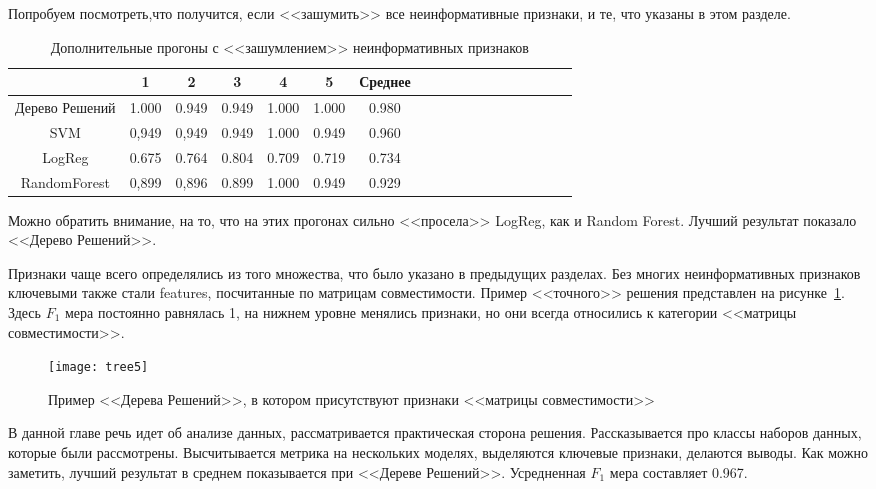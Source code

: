 Попробуем посмотреть,что получится, если <<зашумить>> все неинформативные признаки, и те, что указаны в этом разделе.

\begin{table}[!h]
	\centering
	\caption{Дополнительные прогоны с <<зашумлением>> неинформативных признаков }
	\label{tab4}
			\begin{tabu}{|*{18}{c|}}\hline
			&  1  & 2 & 3 & 4 & 5 & Среднее \\\hline
			Дерево Решений & 1.000 & 0.949 & 0.949  & 1.000 & 1.000 & 0.980 \\\hline
			SVM                    &  0,949  & 0,949  & 0.949  & 1.000 & 0.949 & 0.960 \\\hline
			LogReg              & 0.675 & 0.764 & 0.804  & 0.709 & 0.719 & 0.734  \\\hline
			RandomForest    &   0,899  & 0,896 & 0.899 &  1.000 & 0.949 & 0.929 \\\hline
		\end{tabu}
\end{table}

Можно обратить внимание, на то, что на этих прогонах сильно <<просела>> LogReg, как и Random Forest.
Лучший результат показало <<Дерево Решений>>.

 Признаки чаще всего определялись из того множества, что было указано в предыдущих разделах.
 Без многих неинформативных признаков ключевыми также стали features, посчитанные по матрицам совместимости.
 Пример <<точного>> решения представлен на рисунке~\ref{tree5}.
 Здесь $F_1$ мера постоянно равнялась 1, на нижнем уровне менялись признаки, но они всегда относились к категории <<матрицы совместимости>>.

\begin{figure}[h]
	\caption{Пример <<Дерева Решений>>, в котором присутствуют признаки <<матрицы совместимости>> \label{tree5}} \centering
	\texttt{[image: tree5]}
\end{figure}


\chapterconclusion

В данной главе речь идет об анализе данных, рассматривается практическая сторона решения.
Рассказывается про классы наборов данных, которые были рассмотрены.
Высчитывается метрика на нескольких моделях, выделяются ключевые признаки, делаются выводы.
Как можно заметить, лучший результат в среднем показывается при <<Дереве Решений>>.
Усредненная $F_1$ мера составляет 0.967.

